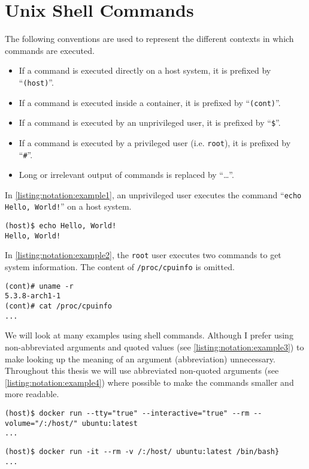 \section{Unix Shell Commands}
The following conventions are used to represent the different contexts in which commands are executed.

\begin{itemize}
    \item If a command is executed directly on a host system, it is prefixed by ``\lstinline{(host)}''.
    \item If a command is executed inside a container, it is prefixed by ``\lstinline{(cont)}''.
    \item If a command is executed by an unprivileged user, it is prefixed by ``\lstinline{$}''.
    \item If a command is executed by a privileged user (i.e. \lstinline{root}), it is prefixed by ``\lstinline{#}''.
    \item Long or irrelevant output of commands is replaced by ``\ldots''.
\end{itemize}

\medskip

In \autoref{listing:notation:example1}, an unprivileged user executes the command ``\lstinline{echo Hello, World!}'' on a host system.
\begin{lstlisting}[caption={Shell command notation example 1.}, captionpos=b, label={listing:notation:example1}]
(host)$ echo Hello, World!
Hello, World!
\end{lstlisting}

\medskip

In \autoref{listing:notation:example2}, the \lstinline{root} user executes two commands to get system information. The content of \lstinline{/proc/cpuinfo} is omitted.
\begin{lstlisting}[caption={Shell command notation example 2.}, captionpos=b, label={listing:notation:example2}]
(cont)# uname -r
5.3.8-arch1-1
(cont)# cat /proc/cpuinfo
...
\end{lstlisting}

\medskip

We will look at many examples using shell commands. Although I prefer using non-abbreviated arguments and quoted values (see \autoref{listing:notation:example3}) to make looking up the meaning of an argument (abbreviation) unnecessary. Throughout this thesis we will use abbreviated non-quoted arguments (see \autoref{listing:notation:example4}) where possible to make the commands smaller and more readable.

\begin{lstlisting}[caption={Abbreviated non-quoted command example.}, captionpos=b, label={listing:notation:example3}]
(host)$ docker run --tty="true" --interactive="true" --rm --volume="/:/host/" ubuntu:latest
...
\end{lstlisting}

\begin{lstlisting}[caption={Non-abbreviated quoted command example.}, captionpos=b, label={listing:notation:example4}]
(host)$ docker run -it --rm -v /:/host/ ubuntu:latest /bin/bash}
...
\end{lstlisting}
